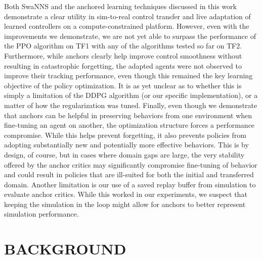 \documentclass[letterpaper, 10 pt, conference]{ieeeconf} %
\newcommand{\framework}{SwaNNS}
\begin{document}
        Both \framework{} and the anchored learning techniques discussed in this work demonstrate a clear utility in sim-to-real control transfer and live adaptation of learned controllers on a compute-constrained platform.
        However, even with the improvements we demonstrate, we are not yet able to surpass the performance of the PPO algorithm on TF1 with any of the algorithms tested so far on TF2.
        Furthermore, while anchors clearly help improve control smoothness without resulting in catastrophic forgetting, the adapted agents were not observed to improve their tracking performance, even though this remained the key learning objective of the policy optimization.
        It is as yet unclear as to whether this is simply a limitation of the DDPG algorithm (or our specific implementation), or a matter of how the regularization was tuned.
        Finally, even though we demonstrate that anchors can be helpful in preserving behaviors from one environment when fine-tuning an agent on another, the optimization structure forces a performance compromise.
        While this helps prevent forgetting, it also prevents policies from adopting substantially new and potentially more effective behaviors.
        This is by design, of course, but in cases where domain gaps are large, the very stability offered by the anchor critics may significantly compromise fine-tuning of behavior and could result in policies that are ill-suited for both the initial and transferred domain. 
        Another limitation is our use of a saved replay buffer from simulation to evaluate anchor critics. While this worked in our experiments, we suspect that keeping the simulation in the loop might allow for anchors to better represent simulation performance.

    

\section{BACKGROUND}
\end{document}
